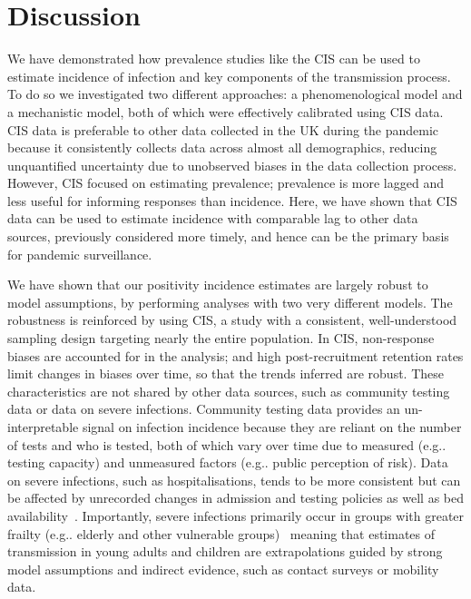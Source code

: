 \documentclass[9pt,twocolumn,twoside]{pnas-new}
\makeatletter
\DeclareRobustCommand\onedot{\futurelet\@let@token\@onedot}
\def\@onedot{\ifx\@let@token.\else.\null\fi\xspace}
\def\eg{e.g\onedot} \def\Eg{{E.g}\onedot}
\makeatother
\begin{document}
\section*{Discussion}

We have demonstrated how prevalence studies like the CIS can be used to estimate incidence of infection and key components of the transmission process.
To do so we investigated two different approaches: a phenomenological model and a mechanistic model, both of which were effectively calibrated using CIS data.
CIS data is preferable to other data collected in the UK during the pandemic because it consistently collects data across almost all demographics, reducing unquantified uncertainty due to unobserved biases in the data collection process.
However, CIS focused on estimating prevalence; prevalence is more lagged and less useful for informing responses than incidence.
Here, we have shown that CIS data can be used to estimate incidence with comparable lag to other data sources, previously considered more timely, and hence can be the primary basis for pandemic surveillance.

We have shown that our positivity incidence estimates are largely robust to model assumptions, by performing analyses with two very different models.
The robustness is reinforced by using CIS, a study with a consistent, well-understood sampling design targeting nearly the entire population.
In CIS, non-response biases are accounted for in the analysis; and high post-recruitment retention rates limit changes in biases over time, so that the trends inferred are robust.
These characteristics are not shared by other data sources, such as community testing data or data on severe infections.
Community testing data provides an un-interpretable signal on infection incidence because they are reliant on the number of tests and who is tested, both of which vary over time due to measured (\eg testing capacity) and unmeasured factors (\eg public perception of risk).
Data on severe infections, such as hospitalisations, tends to be more consistent but can be affected by unrecorded changes in admission and testing policies as well as bed availability~\citep{fongNHS}. Importantly, severe infections primarily occur in groups with greater frailty (\eg elderly and other vulnerable groups)~\citep{wardSero,bhopalChildren} meaning that estimates of transmission in young adults and children are extrapolations guided by strong model assumptions and indirect evidence, such as contact surveys or mobility data.
\end{document}
